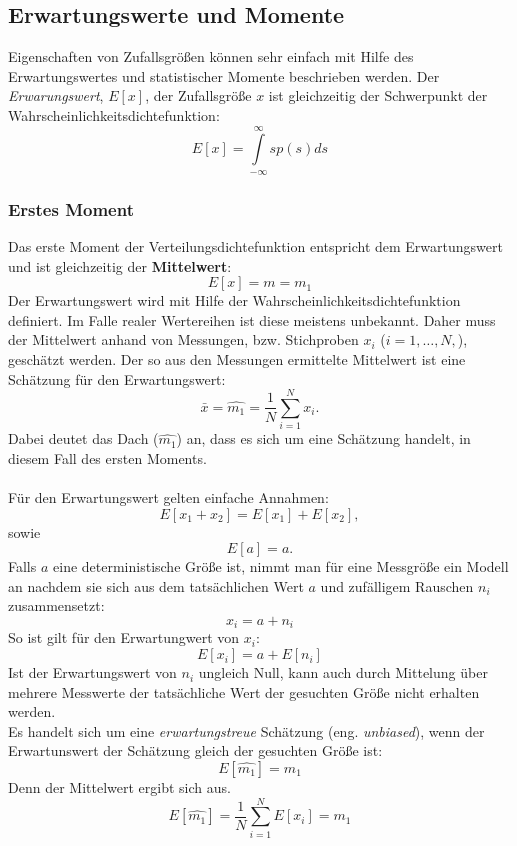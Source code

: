 \subsection{Erwartungswerte und Momente}
Eigenschaften von Zufallsgrößen können sehr einfach mit Hilfe des Erwartungswertes und statistischer Momente beschrieben werden. Der \textit{Erwarungswert}, $E[x]$, der Zufallsgröße $x$ ist gleichzeitig der Schwerpunkt der Wahrscheinlichkeitsdichtefunktion:
\begin{equation}
E[x] = \int\limits_{-\infty}^{\infty}sp(s)ds
\end{equation}

\subsubsection*{Erstes Moment}
Das erste Moment der Verteilungsdichtefunktion entspricht dem Erwartungswert und ist gleichzeitig der \textbf{Mittelwert}:
\[
E[x]=m=m_1
\]
Der Erwartungswert wird mit Hilfe der Wahrscheinlichkeitsdichtefunktion definiert. Im Falle realer Wertereihen ist diese meistens unbekannt. Daher muss der Mittelwert anhand von Messungen, bzw. Stichproben $x_i$ ($i=1,\dots, N,$), geschätzt werden. Der so aus den Messungen ermittelte Mittelwert ist eine Schätzung für den Erwartungswert:
\begin{equation}
\bar{x} = \hat{m_1} = \frac{1}{N}\sum \limits_{i=1}^N x_i.
\end{equation}
Dabei deutet das Dach ($\hat{m_1}$) an, dass es sich um eine Schätzung handelt, in diesem Fall des ersten Moments.\\\\
Für den Erwartungswert gelten einfache Annahmen:
\[
E[x_1+x_2]=E[x_1]+E[x_2],
\]
sowie
\[
E[a]=a.
\]
Falls $a$ eine deterministische Größe ist, nimmt man für eine Messgröße ein Modell an nachdem sie sich aus dem tatsächlichen Wert $a$ und zufälligem Rauschen $n_i$  zusammensetzt:
\[
x_i = a + n_i
\]
So ist gilt für den Erwartungwert von $x_i$:
\[
E[x_i] = a + E[n_i]
\]
Ist der Erwartungswert von $n_i$ ungleich Null, kann auch durch Mittelung über mehrere Messwerte der tatsächliche Wert der gesuchten Größe nicht erhalten werden.\\

Es handelt sich um eine \textit{erwartungstreue} Schätzung (eng. \textsl{unbiased}), wenn der Erwartunswert der Schätzung gleich der gesuchten Größe ist:
\[
E[\hat{m_1} ]= m_1
\]
Denn der Mittelwert ergibt sich aus.
\[
E[\hat{m_1}] =\frac{1}{N}\sum \limits_{i=1}^N E[x_i] = m_1
\]


